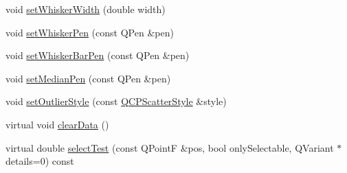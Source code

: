 \begin{DoxyCompactItemize}
\item 
void \mbox{\hyperlink{class_q_c_p_statistical_box_adf378812446bd66f34d1f7f293d991cd}{set\+Whisker\+Width}} (double width)
\item 
void \mbox{\hyperlink{class_q_c_p_statistical_box_a4a5034cb3b9b040444df05ab1684620b}{set\+Whisker\+Pen}} (const Q\+Pen \&pen)
\item 
void \mbox{\hyperlink{class_q_c_p_statistical_box_aa8d3e503897788e1abf68dc74b5f147f}{set\+Whisker\+Bar\+Pen}} (const Q\+Pen \&pen)
\item 
void \mbox{\hyperlink{class_q_c_p_statistical_box_a7260ac55b669f5d0a74f16d5ca84c52c}{set\+Median\+Pen}} (const Q\+Pen \&pen)
\item 
void \mbox{\hyperlink{class_q_c_p_statistical_box_ad5241943422eb8e58360a97e99ad6aa7}{set\+Outlier\+Style}} (const \mbox{\hyperlink{class_q_c_p_scatter_style}{Q\+C\+P\+Scatter\+Style}} \&style)
\item 
virtual void \mbox{\hyperlink{class_q_c_p_statistical_box_a19112994449df0c20287858436cc68e3}{clear\+Data}} ()
\item 
virtual double \mbox{\hyperlink{class_q_c_p_statistical_box_a0153ac16326b94450afbca208e3f9961}{select\+Test}} (const Q\+PointF \&pos, bool only\+Selectable, Q\+Variant $\ast$details=0) const
\end{DoxyCompactItemize}
